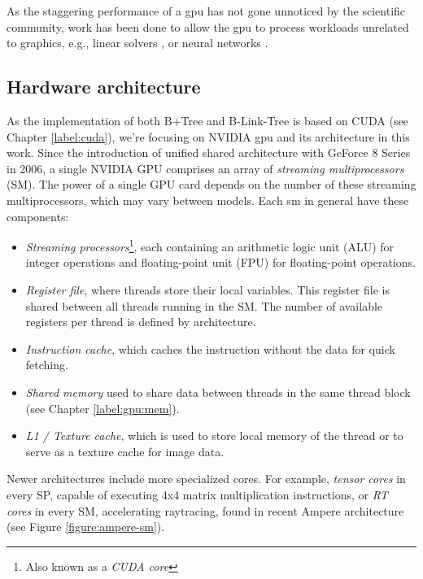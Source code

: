 As the staggering performance of a \acrshort{gpu} has not gone unnoticed by the scientific community, work has been done to allow the \acrshort{gpu} to process workloads unrelated to graphics, e.g., linear solvers \cite{cusolver}, or neural networks \cite{cudnn}.

\subsection{Hardware architecture}

As the implementation of both B+Tree and B-Link-Tree is based on CUDA (see Chapter \ref{label:cuda}), we're focusing on NVIDIA \acrshort{gpu} and its architecture in this work. Since the introduction of unified shared architecture with GeForce 8 Series in 2006, a single NVIDIA GPU comprises an array of \textit{streaming multiprocessors} (SM). The power of a single GPU card depends on the number of these streaming multiprocessors, which may vary between models. Each \acrshort{sm} in general have these components:
\begin{itemize}
  \item \textit{Streaming processors}\footnote{Also known as a \textit{CUDA core}}, each containing an arithmetic logic unit (ALU) for integer operations and floating-point unit (FPU) for floating-point operations.
  \item \textit{Register file}, where threads store their local variables. This register file is shared between all threads running in the SM. The number of available registers per thread is defined by architecture.
  \item \textit{Instruction cache}, which caches the instruction without the data for quick fetching.
  \item \textit{Shared memory} used to share data between threads in the same thread block (see Chapter \ref{label:gpu:mem}).
  \item \textit{L1 / Texture cache}, which is used to store local memory of the thread or to serve as a texture cache for image data.
\end{itemize}

Newer architectures include more specialized cores. For example, \textit{tensor cores} in every SP, capable of executing 4x4 matrix multiplication instructions, or \textit{RT cores} in every SM, accelerating raytracing, found in recent Ampere architecture (see Figure \ref{figure:ampere-sm}).

